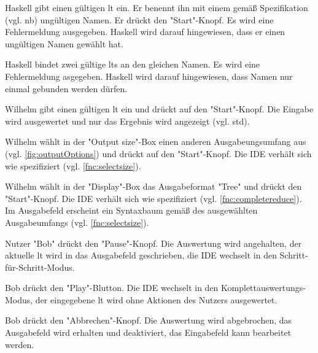 \documentclass[parskip=full,11pt,twoside]{scrartcl}
\begin{document}
{Haskell gibt einen gültigen \gls{lt} ein.
 Er benennt ihn mit einem gemäß Spezifikation (vgl. \gls{nb}) ungültigen Namen.
 Er drückt den "Start"-Knopf.}
{Es wird eine Fehlermeldung ausgegeben.
 Haskell wird darauf hingewiesen, dass er einen ungültigen Namen gewählt hat.}

{Haskell bindet zwei gültige \glspl{lt} an den gleichen Namen.}
{Es wird eine Fehlermeldung asgegeben. Haskell wird darauf hingewiesen, dass Namen
nur einmal gebunden werden dürfen.}


{Wilhelm gibt einen gültigen \gls{lt} ein und drückt auf den "Start"-Knopf. }
{Die Eingabe wird ausgewertet und nur das Ergebnis wird angezeigt (vgl. \gls{std}).}

{Wilhelm wählt in der "Output size"-Box einen anderen Ausgabeungsumfang aus (vgl. \ref{fig:outputOptions}) und drückt auf den "Start"-Knopf.}
{Die IDE verhält sich wie spezifiziert (vgl. \ref{fnc:selectsize}).}

{Wilhelm wählt in der "Display"-Box das Ausgabeformat "Tree" und drückt den "Start"-Knopf.}
{Die IDE verhält sich wie spezifiziert (vgl. \ref{fnc:completereduce}).
 Im Ausgabefeld erscheint ein Syntaxbaum gemäß des ausgewählten Ausgabeumfangs (vgl. \ref{fnc:selectsize}).}
 

{Nutzer "Bob" drückt den "Pause"-Knopf.}
{Die Auswertung wird angehalten, der aktuelle \gls{lt} wird in das Ausgabefeld geschrieben, die IDE wechselt in den Schritt-für-Schritt-Modus.}

{Bob drückt den "Play"-Blutton.}
{Die IDE wechselt in den Komplettauswertungs-Modus, der eingegebene \gls{lt} wird ohne Aktionen des Nutzers ausgewertet.}

{Bob drückt den "Abbrechen"-Knopf.}
{Die Auswertung wird abgebrochen, das Ausgabefeld wird erhalten und deaktiviert, das Eingabefeld kann bearbeitet werden.}
 
\end{document}
